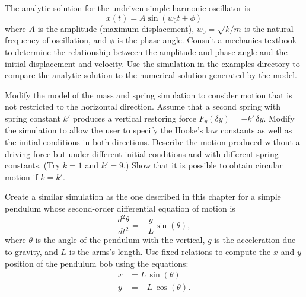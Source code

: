 \begin{problem}
The analytic solution for the undriven simple harmonic oscillator is
\begin{equation}
  x(t)=A \sin(w_0 t + \phi)
\end{equation}
where $A$ is the amplitude (maximum displacement), $w_0= \sqrt{k/m}$ is the natural frequency of oscillation, and
$\phi$ is the phase angle.  Consult a mechanics textbook to determine the relationship between the amplitude and phase
angle and the initial displacement and velocity.  Use the  simulation in the
examples directory to compare the analytic solution to the numerical solution generated by the
 model.
\end{problem}

\begin{project}
Modify the model of the mass and spring simulation to consider motion that is not restricted to the horizontal
direction.  Assume that a second spring with spring constant $k'$ produces a vertical restoring force $F_y(\delta y) = - k' \,\delta y$. Modify the simulation to allow the user to specify the Hooke's law constants as well as the initial conditions in both directions. Describe the motion produced without a driving force but under different initial conditions and with different spring constants. (Try $k=1$ and $k'=9$.)  Show that it is possible to obtain circular motion if $k=k'$.
\end{project}

\begin{project}
Create a similar simulation as the one described in this chapter for a simple pendulum whose second-order differential
equation of motion is
\begin{equation}
  \frac{d^2\theta}{dt^2} = -\frac{g}{L} \sin (\theta),
\end{equation}
where $\theta$ is the angle of the pendulum with the vertical, $g$ is the acceleration due to gravity, and $L$ is the arms's length. Use fixed relations to compute the $x$ and $y$ position of the pendulum bob using the equations:
\begin{align*}
   x   &=  L \, \sin (\theta) \\
   y   &= -L \, \cos (\theta).
\end{align*}
\end{project}
